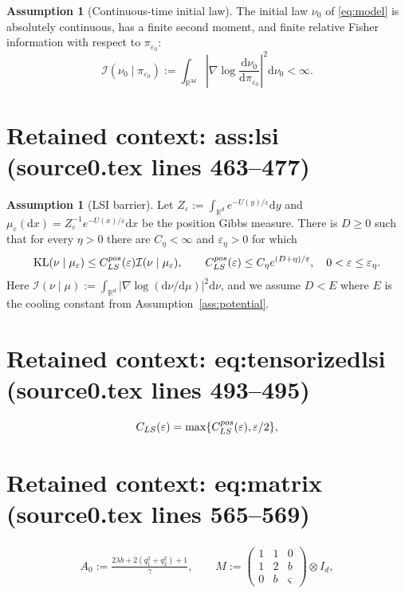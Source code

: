 \documentclass[10pt,a4paper]{amsart}
\newcommand{\Id}{I}
\newcommand{\KL}{\operatorname{KL}}
\newcommand{\R}{\mathbb R}
\newcommand{\cI}{\mathcal I}
\newcommand{\dd}{\mathrm d}
\newcommand{\eps}{\varepsilon}
\theoremstyle{plain}
\theoremstyle{definition}
\newtheorem{assumption}[theorem]{Assumption}
\begin{document}
\begin{assumption}[Continuous-time initial law]\label{ass:initial}
The initial law $\nu_0$ of \eqref{eq:model} is absolutely continuous, has a finite
second moment, and finite
relative Fisher information with respect to $\pi_{\eps_0}$:
\begin{equation}\label{eq:initialfisher}
 \cI(\nu_0\mid\pi_{\eps_0})
 :=\int_{\R^{3d}}
 \left|\nabla\log\frac{\dd\nu_0}{\dd\pi_{\eps_0}}\right|^2\dd\nu_0
 <\infty.
\end{equation}
\end{assumption}


\section*{Retained context: ass:lsi (source0.tex lines 463--477)}

\begin{assumption}[LSI barrier]\label{ass:lsi}
Let $Z_\eps:=\int_{\R^d}e^{-U(y)/\eps}\dd y$ and
$\mu_\eps(\dd x)=Z_\eps^{-1}e^{-U(x)/\eps}\dd x$ be the position
Gibbs measure. There is $D\geq0$ such that for every $\eta>0$ there are
$C_\eta<\infty$ and $\eps_\eta>0$ for which
\begin{equation}\label{eq:lsi}
 \KL(\nu\mid\mu_\eps)\leq C_{\rm LS}^{\rm pos}(\eps)
       \cI(\nu\mid\mu_\eps),
 \qquad C_{\rm LS}^{\rm pos}(\eps)\leq C_\eta e^{(D+\eta)/\eps},
 \quad 0<\eps\leq\eps_\eta.
\end{equation}
Here $\cI(\nu\mid\mu):=\int_{\R^d}|\nabla\log(\dd\nu/\dd\mu)|^2\dd\nu$, and we assume
$D<E$ where $E$ is the cooling
constant from Assumption~\ref{ass:potential}.
\end{assumption}


\section*{Retained context: eq:tensorizedlsi (source0.tex lines 493--495)}

\begin{equation}\label{eq:tensorizedlsi}
 C_{\rm LS}(\eps)=\max\{C_{\rm LS}^{\rm pos}(\eps),\eps/2\},
\end{equation}


\section*{Retained context: eq:matrix (source0.tex lines 565--569)}

\begin{align}\label{eq:matrix}
A_0:=\frac{2\lambda b+2(q_1^2+q_2^2)+1}{\gamma},
\qquad
M:=\begin{pmatrix}1&1&0\\1&2&b\\0&b&\varsigma\end{pmatrix}\otimes\Id_d,
\end{align}
\end{document}
